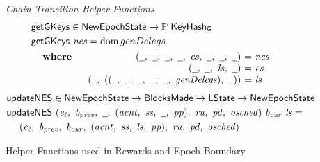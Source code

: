 \begin{figure}[htb]
  \emph{Chain Transition Helper Functions}
  \begin{align*}
      & \fun{getGKeys} \in \NewEpochState \to \powerset{\KeyHashGen} \\
      & \fun{getGKeys}~\var{nes} = \dom{genDelegs} \\
      &
      \begin{array}{lr@{~=~}l}
        \where
          & (\wcard,~\wcard,~\wcard,~\wcard,~\var{es},~\wcard,~\wcard,~\wcard)
          & \var{nes}
          \\
          & (\wcard,~\wcard,~\var{ls},~\wcard)
          & \var{es}
          \\
          & (\wcard,~((\wcard,~\wcard,~\wcard,~\wcard,~\wcard,~\var{genDelegs}),~\wcard))
          & \var{ls}
      \end{array}
  \end{align*}
  \begin{align*}
      & \fun{updateNES} \in \NewEpochState \to \BlocksMade \to \LState \to \NewEpochState \\
      & \fun{updateNES}~
      (\var{e_\ell},~\var{b_{prev}},~\wcard,~(\var{acnt},~\var{ss},~\wcard,~\var{pp}),
       ~\var{ru},~\var{pd},~\var{osched})
          ~\var{b_{cur}}~\var{ls} = \\
      & ~~~~
      (\var{e_\ell},~\var{b_{prev}},~\var{b_{cur}},
       ~(\var{acnt},~\var{ss},~\var{ls},~\var{pp}),~\var{ru},~\var{pd},~\var{osched})
  \end{align*}

  \caption{Helper Functions used in Rewards and Epoch Boundary}
  \label{fig:funcs:chain-helper}
\end{figure}

